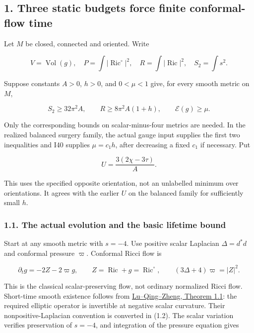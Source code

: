 \documentclass[
  10pt,
]{article}
\begin{document}
\hypertarget{three-static-budgets-force-finite-conformal-flow-time}{%
\subsection{1. Three static budgets force finite conformal-flow
time}\label{three-static-budgets-force-finite-conformal-flow-time}}

Let \(M\) be closed, connected and oriented. Write

\[
 V=\operatorname{Vol}(g),\quad P=\int|\operatorname{Ric}^{\circ}|^2,
 \quad R=\int|\operatorname{Ric}|^2,
 \quad S_2=\int s^2.
\]

Suppose constants \(A>0\), \(h>0\), and \(0<\mu<1\) give, for every
smooth metric on \(M\),

\[
 S_2\ge32\pi^2A,\qquad R\ge8\pi^2A(1+h),
 \qquad \mathcal E(g)\ge\mu.                         \tag{1.1}
\]

Only the corresponding bounds on scalar-minus-four metrics are needed.
In the realized balanced surgery family, the actual gauge input supplies
the first two inequalities and I40 supplies \(\mu=c_1h\), after
decreasing a fixed \(c_1\) if necessary. Put

\[
 U=\frac{3(2\chi-3\tau)}A.
\]

This uses the specified opposite orientation, not an unlabelled minimum
over orientations. It agrees with the earlier \(U\) on the balanced
family for sufficiently small \(h\).

\hypertarget{the-actual-evolution-and-the-basic-lifetime-bound}{%
\subsubsection{1.1. The actual evolution and the basic lifetime
bound}\label{the-actual-evolution-and-the-basic-lifetime-bound}}

Start at any smooth metric with \(s=-4\). Use positive scalar Laplacian
\(\Delta=d^*d\) and conformal pressure \(\varpi\). Conformal Ricci flow
is

\[
 \partial_tg=-2Z-2\varpi g,\qquad
 Z=\operatorname{Ric}+g=\operatorname{Ric}^{\circ},\qquad
 (3\Delta+4)\varpi=|Z|^2.                            \tag{1.2}
\]

This is the classical scalar-preserving flow, not ordinary normalized
Ricci flow. Short-time smooth existence follows from
\href{https://arxiv.org/pdf/1109.5377}{Lu--Qing--Zheng, Theorem 1.1}:
the required elliptic operator is invertible at negative scalar
curvature. Their nonpositive-Laplacian convention is converted in (1.2).
The scalar variation verifies preservation of \(s=-4\), and integration
of the pressure equation gives
\end{document}

